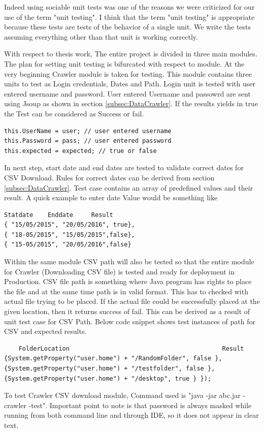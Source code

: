 \documentclass[article,type=msc,colorback,accentcolor=tud9c,twoside,11pt]{tudthesis}
\begin{document}
Indeed using sociable unit tests was one of the reasons we were criticized for our use of the term "unit testing". I think that the term "unit testing" is appropriate because these tests are tests of the behavior of a single unit. We write the tests assuming everything other than that unit is working correctly.

With respect to thesis work, The entire project is divided in three main modules. The plan for setting unit testing is bifurcated with respect to module. At the very beginning Crawler module is taken for testing. This module contains three units to test as Login credentials, Dates and Path. Login unit is tested with user entered username and password. User entered Username and passowrd are sent using Jsoup as shown in section \ref{subsec:DataCrawler}. If the results yields in true the Test can be considered as Success or fail.
\begin{lstlisting}
this.UserName = user; // user entered username
this.Password = pass; // user entered password
this.expected = expected; // true or false
\end{lstlisting}
 In next step, start date and end dates are tested to validate correct dates for CSV Download. Rules for correct dates can be derived from section \ref{subsec:DataCrawler}. Test case contains an array of predefined values and their result. A quick example to enter date Value would be something like
\begin{lstlisting}
Statdate 	Enddate 	Result
{ "15/05/2015", "20/05/2016", true},
{ "18-05/2015", "15/05/2015",false},
{ "15-05/2015", "20/05/2016",false}
\end{lstlisting}
 Within the same module CSV path will also be tested so that the entire module for Crawler (Downloading CSV file) is tested and ready for deployment in Production. CSV file path is something where Java program has rights to place the file and at the same time path is in valid format. This has to checked with actual file trying to be placed. If the actual file could be successfully placed at the given location, then it returns success of fail. This can be derived as a result of unit test case for CSV Path. Below code snippet shows test instances of path for CSV and expected results.
 \clearpage
 \begin{lstlisting}
	FolderLocation											Result
{System.getProperty("user.home") + "/RandomFolder", false },
{System.getProperty("user.home") + "/testfolder", false },
{System.getProperty("user.home") + "/desktop", true } });
\end{lstlisting}
 To test Crawler CSV download module, Command used is "java -jar abc.jar -crawler -test". Important point to note is that password is always masked while running from both command line and through IDE, so it does not appear in clear text.
 
\end{document}
